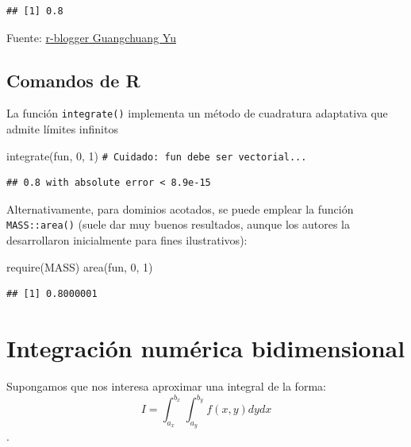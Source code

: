 \documentclass[
]{book}
\newenvironment{Shaded}{\begin{snugshade}}{\end{snugshade}}
\newcommand{\CommentTok}[1]{\textcolor[rgb]{0.56,0.35,0.01}{\textit{#1}}}
\newcommand{\DecValTok}[1]{\textcolor[rgb]{0.00,0.00,0.81}{#1}}
\newcommand{\FunctionTok}[1]{\textcolor[rgb]{0.00,0.00,0.00}{#1}}
\newcommand{\NormalTok}[1]{#1}
\theoremstyle{break}
\theoremstyle{nonumberplain}
\renewcommand{\CommentTok}[1]{\textcolor[rgb]{0.41,0.41,0.41}{\texttt{#1}}}
\begin{document}
\begin{verbatim}
## [1] 0.8
\end{verbatim}

Fuente: \href{https://www.r-bloggers.com/one-dimensional-integrals}{r-blogger Guangchuang Yu}

\hypertarget{comandos-de-r}{%
\subsection{Comandos de R}\label{comandos-de-r}}

La función \texttt{integrate()} implementa un método de cuadratura adaptativa que admite límites infinitos

\begin{Shaded}
\begin{Highlighting}[]
\FunctionTok{integrate}\NormalTok{(fun, }\DecValTok{0}\NormalTok{, }\DecValTok{1}\NormalTok{)  }\CommentTok{\# Cuidado: fun debe ser vectorial...}
\end{Highlighting}
\end{Shaded}

\begin{verbatim}
## 0.8 with absolute error < 8.9e-15
\end{verbatim}

Alternativamente, para dominios acotados, se puede emplear la función \texttt{MASS::area()} (suele dar muy buenos resultados, aunque los autores la desarrollaron inicialmente para fines ilustrativos):

\begin{Shaded}
\begin{Highlighting}[]
\FunctionTok{require}\NormalTok{(MASS)}
\FunctionTok{area}\NormalTok{(fun, }\DecValTok{0}\NormalTok{, }\DecValTok{1}\NormalTok{)}
\end{Highlighting}
\end{Shaded}

\begin{verbatim}
## [1] 0.8000001
\end{verbatim}

\hypertarget{integraciuxf3n-numuxe9rica-bidimensional}{%
\section{Integración numérica bidimensional}\label{integraciuxf3n-numuxe9rica-bidimensional}}

Supongamos que nos interesa aproximar una integral de la forma:
\[I=\int_{a_x}^{b_x}\int_{a_y}^{b_y}f(x, y)dy dx\].
\end{document}
